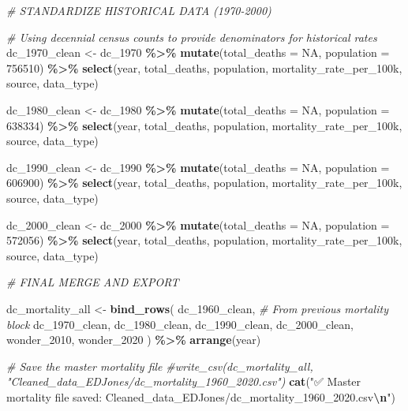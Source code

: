 \documentclass[
]{article}
\newenvironment{Shaded}{\begin{snugshade}}{\end{snugshade}}
\newcommand{\AttributeTok}[1]{\textcolor[rgb]{0.13,0.29,0.53}{#1}}
\newcommand{\CommentTok}[1]{\textcolor[rgb]{0.56,0.35,0.01}{\textit{#1}}}
\newcommand{\ConstantTok}[1]{\textcolor[rgb]{0.56,0.35,0.01}{#1}}
\newcommand{\DecValTok}[1]{\textcolor[rgb]{0.00,0.00,0.81}{#1}}
\newcommand{\FunctionTok}[1]{\textcolor[rgb]{0.13,0.29,0.53}{\textbf{#1}}}
\newcommand{\NormalTok}[1]{#1}
\newcommand{\OtherTok}[1]{\textcolor[rgb]{0.56,0.35,0.01}{#1}}
\newcommand{\SpecialCharTok}[1]{\textcolor[rgb]{0.81,0.36,0.00}{\textbf{#1}}}
\newcommand{\StringTok}[1]{\textcolor[rgb]{0.31,0.60,0.02}{#1}}
\begin{document}
\begin{Shaded}
\begin{Highlighting}[]
\CommentTok{\# STANDARDIZE HISTORICAL DATA (1970{-}2000)}

\CommentTok{\# Using decennial census counts to provide denominators for historical rates}
\NormalTok{dc\_1970\_clean }\OtherTok{\textless{}{-}}\NormalTok{ dc\_1970 }\SpecialCharTok{\%\textgreater{}\%}
  \FunctionTok{mutate}\NormalTok{(}\AttributeTok{total\_deaths =} \ConstantTok{NA}\NormalTok{, }\AttributeTok{population =} \DecValTok{756510}\NormalTok{) }\SpecialCharTok{\%\textgreater{}\%}
  \FunctionTok{select}\NormalTok{(year, total\_deaths, population, mortality\_rate\_per\_100k, source, data\_type)}

\NormalTok{dc\_1980\_clean }\OtherTok{\textless{}{-}}\NormalTok{ dc\_1980 }\SpecialCharTok{\%\textgreater{}\%}
  \FunctionTok{mutate}\NormalTok{(}\AttributeTok{total\_deaths =} \ConstantTok{NA}\NormalTok{, }\AttributeTok{population =} \DecValTok{638334}\NormalTok{) }\SpecialCharTok{\%\textgreater{}\%}
  \FunctionTok{select}\NormalTok{(year, total\_deaths, population, mortality\_rate\_per\_100k, source, data\_type)}

\NormalTok{dc\_1990\_clean }\OtherTok{\textless{}{-}}\NormalTok{ dc\_1990 }\SpecialCharTok{\%\textgreater{}\%}
  \FunctionTok{mutate}\NormalTok{(}\AttributeTok{total\_deaths =} \ConstantTok{NA}\NormalTok{, }\AttributeTok{population =} \DecValTok{606900}\NormalTok{) }\SpecialCharTok{\%\textgreater{}\%}
  \FunctionTok{select}\NormalTok{(year, total\_deaths, population, mortality\_rate\_per\_100k, source, data\_type)}

\NormalTok{dc\_2000\_clean }\OtherTok{\textless{}{-}}\NormalTok{ dc\_2000 }\SpecialCharTok{\%\textgreater{}\%}
  \FunctionTok{mutate}\NormalTok{(}\AttributeTok{total\_deaths =} \ConstantTok{NA}\NormalTok{, }\AttributeTok{population =} \DecValTok{572056}\NormalTok{) }\SpecialCharTok{\%\textgreater{}\%}
  \FunctionTok{select}\NormalTok{(year, total\_deaths, population, mortality\_rate\_per\_100k, source, data\_type)}


\CommentTok{\# FINAL MERGE AND EXPORT}

\NormalTok{dc\_mortality\_all }\OtherTok{\textless{}{-}} \FunctionTok{bind\_rows}\NormalTok{(}
\NormalTok{  dc\_1960\_clean, }\CommentTok{\# From previous mortality block}
\NormalTok{  dc\_1970\_clean,}
\NormalTok{  dc\_1980\_clean,}
\NormalTok{  dc\_1990\_clean,}
\NormalTok{  dc\_2000\_clean,}
\NormalTok{  wonder\_2010,}
\NormalTok{  wonder\_2020}
\NormalTok{) }\SpecialCharTok{\%\textgreater{}\%}
  \FunctionTok{arrange}\NormalTok{(year)}

\CommentTok{\# Save the master mortality file}
\CommentTok{\#write\_csv(dc\_mortality\_all, "Cleaned\_data\_EDJones/dc\_mortality\_1960\_2020.csv")}
\FunctionTok{cat}\NormalTok{(}\StringTok{"✅ Master mortality file saved: Cleaned\_data\_EDJones/dc\_mortality\_1960\_2020.csv}\SpecialCharTok{\textbackslash{}n}\StringTok{"}\NormalTok{)}
\end{Highlighting}
\end{Shaded}
\end{document}
